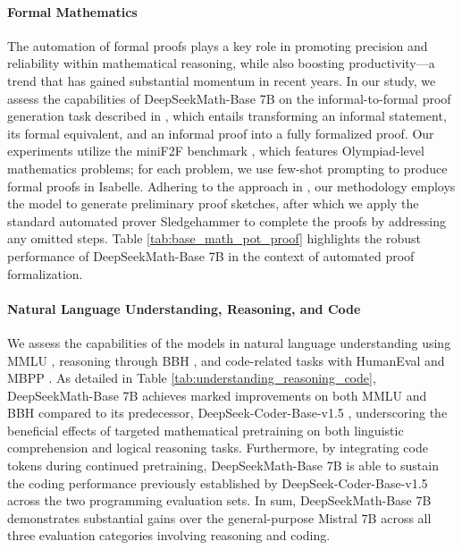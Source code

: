 \begin{itemize}[topsep=0pt]
\paragraph{Formal Mathematics}

The automation of formal proofs plays a key role in promoting precision and reliability within mathematical reasoning, while also boosting productivity—a trend that has gained substantial momentum in recent years. In our study, we assess the capabilities of DeepSeekMath-Base 7B on the informal-to-formal proof generation task described in \citep{dsp_proof}, which entails transforming an informal statement, its formal equivalent, and an informal proof into a fully formalized proof. Our experiments utilize the miniF2F benchmark \citep{minif2f}, which features Olympiad-level mathematics problems; for each problem, we use few-shot prompting to produce formal proofs in Isabelle. Adhering to the approach in \cite{dsp_proof}, our methodology employs the model to generate preliminary proof sketches, after which we apply the standard automated prover Sledgehammer \citep{sledgehammer} to complete the proofs by addressing any omitted steps. Table \ref{tab:base_math_pot_proof} highlights the robust performance of DeepSeekMath-Base 7B in the context of automated proof formalization.

\paragraph{Natural Language Understanding, Reasoning, and Code}

We assess the capabilities of the models in natural language understanding using MMLU \citep{mmlu}, reasoning through BBH \citep{bbh}, and code-related tasks with HumanEval \citep{codex} and MBPP \citep{mbpp}. As detailed in Table \ref{tab:understanding_reasoning_code}, DeepSeekMath-Base 7B achieves marked improvements on both MMLU and BBH compared to its predecessor, DeepSeek-Coder-Base-v1.5 \citep{deepseek-coder}, underscoring the beneficial effects of targeted mathematical pretraining on both linguistic comprehension and logical reasoning tasks. Furthermore, by integrating code tokens during continued pretraining, DeepSeekMath-Base 7B is able to sustain the coding performance previously established by DeepSeek-Coder-Base-v1.5 across the two programming evaluation sets. In sum, DeepSeekMath-Base 7B demonstrates substantial gains over the general-purpose Mistral 7B \citep{mistral} across all three evaluation categories involving reasoning and coding.


\end{itemize}
